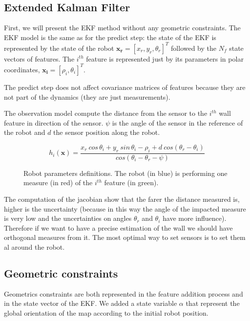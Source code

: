 \documentclass[a4paper,12pt]{article}
\begin{document}
\subsection{Extended Kalman Filter}
\label{sec:EKF}

First, we will present the EKF method without any geometric constraints.
The EKF model is the same as \cite{zunino2001simultaneous} for the predict step: the state of the EKF is represented by the state of the robot $\mathbf{x_r} = \left [x_r,y_r,\theta_r \right ]^T$ followed by the $N_f$ state vectors of features.
The $i^{th}$ feature is represented just by its parameters in polar coordinates, $\mathbf{x_i} = [\rho_i, \theta_i]^T$.

The predict step does not affect covariance matrices of features because they are not part of the dynamics (they are just measurements).

The observation model compute the distance from the sensor to the $i^{th}$ wall feature in direction of the sensor. $\psi$ is the angle of the sensor in the reference of the robot and $d$ the sensor position along the robot.

\begin{equation}
h_i(\mathbf{x}) =\frac{ x_r \: cos \, \theta_i + y_r \: sin \, \theta_i - \rho_i + d\: cos(\theta_r-\theta_i)}{cos(\theta_i-\theta_r-\psi)} 
\end{equation}

\begin{figure}
  	\centering
	
  	\caption{Robot parameters definitions. The robot (in blue) is performing one measure (in red) of the $i^{th}$ feature (in green).}
\end{figure}

The computation of the jacobian show that the farer the distance measured is, higher is the uncertainty (because in this way the angle of the impacted measure is very low and the uncertainties on angles $\theta_r$ and $\theta_i$ have more influence).
Therefore if we want to have a precise estimation of the wall we should have orthogonal measures from it. The most optimal way to set sensors is to set them al around the robot.

\subsection{Geometric constraints}
\label{sec:geom}

Geometrics constraints are both represented in the feature addition process and in the state vector of the EKF.
We added a state variable $\alpha$ that represent the global orientation of the map according to the initial robot position.
\end{document}
